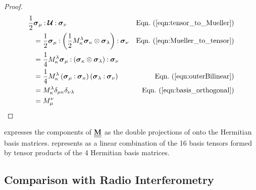 \begin{proof}
\begin{align*}
\frac{1}{2} & \dc{\pauli{\irow}}{\dc{\JT{U}}{\pauli{\icol}}} & \peqn{tensor_to_Mueller} \\
& = \frac{1}{2} \dc{\pauli{\irow}}{\dc{ \left( \frac{1}{2} M_\jrow^\jcol \outerBilinear{\pauli{\jrow}}{\pauli{\jcol}} \right)  }{\pauli{\icol}}} & \peqn{Mueller_to_tensor} \\
& = \frac{1}{4} M_\jrow^\jcol \dc{\pauli{\irow}}{\dc{\left( \outerBilinear{\pauli{\jrow}}{\pauli{\jcol}} \right)}{\pauli{\icol}}} \\
& = \frac{1}{4} M_\jrow^\jcol \left(\dc{\pauli{\irow}}{\pauli{\jrow}}\right)\left(\dc{\pauli{\jcol}}{\pauli{\icol}} \right) & \peqn{outerBilinear} \\
& = M_\jrow^\jcol \delta_{\irow\jrow} \delta_{\icol\jcol} & \peqn{basis_orthogonal}  \\
& = M_\irow^\icol
\end{align*}
\end{proof}

%
 expresses the components of $\underline{\underline{{\bf M}}}$
as the double projections of  onto the Hermitian
basis matrices.
%
 represents  as a linear combination of
the 16 basis tensors formed by tensor products of the 4
Hermitian basis matrices.

%






\subsection{Comparison with Radio Interferometry}
\label{sec:rime}

